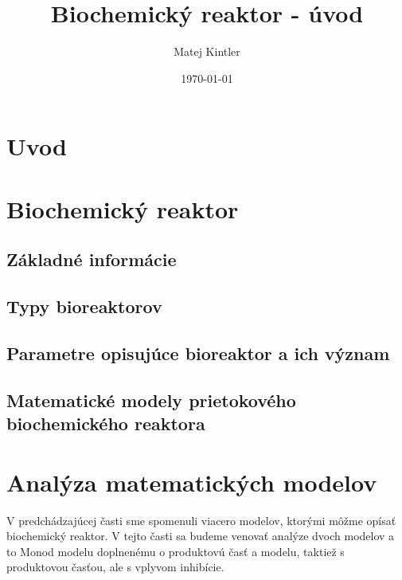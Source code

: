 \documentclass[fleqn]{article}
\title{Biochemický reaktor - úvod}
\author{Matej Kintler}
\date{\today}
\begin{document}
	
\maketitle
\newpage

\tableofcontents
\newpage

\section{Uvod} %

\newpage

\section{Biochemický reaktor}
\subsection{Základné informácie}


\subsection{Typy bioreaktorov}


\subsection{Parametre opisujúce bioreaktor a ich význam}


\subsection{Matematické modely prietokového biochemického reaktora}

\newpage

\section{Analýza matematických modelov}
V predchádzajúcej časti sme spomenuli viacero modelov, ktorými môžme opísať biochemický reaktor. V tejto časti sa budeme venovať analýze dvoch modelov a to Monod modelu doplnenému o produktovú časť a modelu, taktiež s produktovou časťou, ale s vplyvom inhibície.
\end{document}
